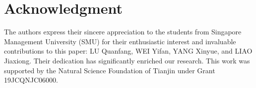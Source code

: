\documentclass[conference]{IEEEtran}
\begin{document}













\section*{Acknowledgment}

The authors express their sincere appreciation to the students from Singapore Management University (SMU) for their enthusiastic interest and invaluable contributions to this paper: LU Quanfang, WEI Yifan, YANG Xinyue, and LIAO Jiaxiong. Their dedication has significantly enriched our research. This work was supported by the Natural Science Foundation
of Tianjin under Grant 19JCQNJC06000.



\end{document}
